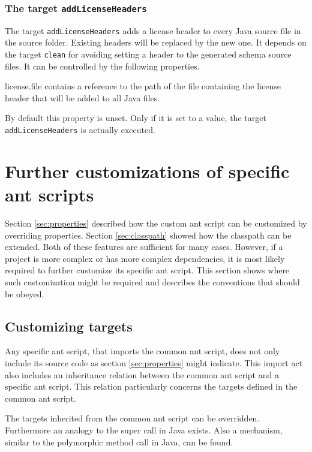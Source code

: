\documentclass[a4paper,twoside,11pt,bibtotoc]{article}
\begin{document}
\subsubsection{The target \texttt{addLicenseHeaders}}
The target \texttt{addLicenseHeaders} adds a license header to every Java source file in the source folder.
Existing headers will be replaced by the new one.
It depends on the target \texttt{clean} for avoiding setting a header to the generated schema source files.
It can be controlled by the following properties.
\begin{description*}
	\item[license.file] contains a reference to the path of the file containing the license header that will be added to all Java files.\par By default this property is unset. Only if it is set to a value, the target \texttt{addLicenseHeaders} is actually executed.
\end{description*}

\section{Further customizations of specific ant scripts}
\label{sec:customize}
Section \ref{sec:properties} described how the custom ant script can be customized by overriding properties.
Section \ref{sec:classpath} showed how the classpath can be extended.
Both of these features are sufficient for many cases.
However, if a project is more complex or has more complex dependencies, it is most likely required to further customize its specific ant script.
This section shows where such customization might be required and describes the conventions that should be obeyed.

\subsection{Customizing targets}
Any specific ant script, that imports the common ant script, does not only include its source code as section \ref{sec:properties} might indicate.
This import act also includes an inheritance relation between the common ant script and a specific ant script.
This relation particularly concerns the targets defined in the common ant script.

The targets inherited from the common ant script can be overridden.
Furthermore an analogy to the super call in Java exists.
Also a mechanism, similar to the polymorphic method call in Java, can be found.
\end{document}
